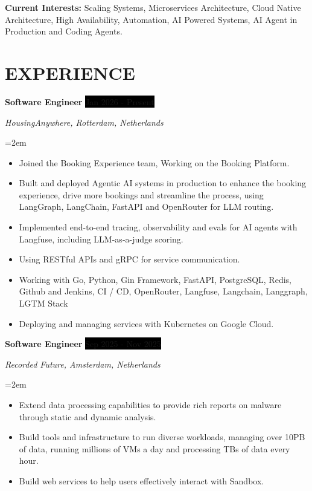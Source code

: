 \documentclass[paper=a4,fontsize=11pt]{scrartcl} %
\newcommand{\sepspace}{\vspace*{1em}}		%
\newcommand{\NewPart}[1]{\section*{\uppercase{#1}}}
\newcommand{\EducationEntry}[4]{
		\noindent \textbf{#1} \hfill      %
		\colorbox{Black}{%
			\parbox{6em}{%
			\hfill\color{White}#2}} \par  %
		\noindent \textit{#3} \par        %
		\noindent\hangindent=2em\hangafter=0 \small #4 %
		\normalsize \par}
\newcommand{\WorkEntry}[4]{				  %
		\noindent \textbf{#1} \hfill      %
		\colorbox{Black}{\color{White}#2} \par  %
		\noindent \textit{#3} \par              %
		\noindent\hangindent=2em\hangafter=0 \small #4 %
		\normalsize \par}
\begin{document}
\sepspace

\textbf{Current Interests:} Scaling Systems, Microservices Architecture, Cloud Native Architecture, High Availability, Automation, AI Powered Systems, AI Agent in Production and Coding Agents.

\sepspace


\NewPart{Experience}{}

\WorkEntry{Software Engineer}{Jan 2026 - Present}{HousingAnywhere, Rotterdam, Netherlands}{\begin{itemize}
\item Joined the Booking Experience team, Working on the Booking Platform.
\item Built and deployed Agentic AI systems in production to enhance the booking experience, drive more bookings and streamline the process, using LangGraph, LangChain, FastAPI and OpenRouter for LLM routing.
\item Implemented end-to-end tracing, observability and evals for AI agents with Langfuse, including LLM-as-a-judge scoring.
\item Using RESTful APIs and gRPC for service communication.
\item Working with Go, Python, Gin Framework, FastAPI, PostgreSQL, Redis, Github and Jenkins, CI / CD, OpenRouter, Langfuse, Langchain, Langgraph, LGTM Stack
\item Deploying and managing services with Kubernetes on Google Cloud.
\end{itemize}}
\sepspace

\WorkEntry{Software Engineer}{Sep 2025 - Nov 2025}{Recorded Future, Amsterdam, Netherlands}{\begin{itemize}
\item Extend data processing capabilities to provide rich reports on malware through static and dynamic analysis.
\item Build tools and infrastructure to run diverse workloads, managing over 10PB of data, running millions of VMs a day and processing TBs of data every hour.
\item Build web services to help users effectively interact with Sandbox.
\end{itemize}}
\sepspace
\end{document}
